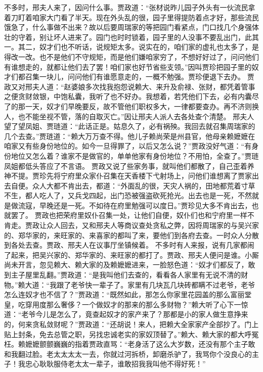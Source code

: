 \documentclass[12pt,oneside]{book}
\begin{document}
不多时，邢夫人来了，因问什么事。贾政道：“张材说昨儿园子外头有一伙流民拿着刀盯着咱家大门看了半天。现在外头乱的很，园子里得提防着点才好，那些流民饿急了，什么事做不出来？故以后要周瑞家的等把园门看紧点，门口找几个身强体壮的守着，别让坏人进来了。园门也时时锁着，园子里的人没事不要乱出门，此其一。其二，奴才们也不听话，说规矩太多。说实在的，咱们家的虚礼也太多了，是得改一改。也不是他们不守规矩，而是他们嫌咱家穷了，不想好好过了，问问他们有谁想走的，就都让他们去了罢！咱们家也好节省些支领。”因叫贾珍把园子里的奴才们都召集一块儿，问问他们有谁愿意走的，一概不勉强。贾珍便退下去办。
贾政又对邢夫人道：“赵婆娘多次找我抱怨说赖大、来升及俞禄、张财，都凭着管事之便贪财敛银，中饱私囊，我听了也不好办。我想着，若凭他们下去，必有内囊尽了的那一天，奴才们早晚要反，故不管他们职权多大，一律都要查办。再不济则换人，也不能坐视不管，落的自取灭亡。”因让邢夫人派人去各处查个清楚。
邢夫人望了望凤姐、贾琏道：“此话正是。姑息久了，必有祸殃。我回去就召集周瑞家的几个去查。”贾琏道：“赖大万万查不得。他儿子赖尚荣是州县官，他母亲赖嬷嬷在咱家又有些身份地位的。如今一旦得罪了，以后又怎么说？”贾政没好气道：“有身份地位又怎么着？谁家不是做官的，单单他家有身份地位？不用怕，全查了。”贾琏凤姐都低头答应了不言语。
贾政又说了些家务事，就叫他们都散了，自己歪着养神不提。贾珍先将宁府里众家仆召集在天香楼下弋射场上，问他们谁想离了贾家出去自便。众人大都不肯出去，都道：“外面乱的很，天灾人祸的，田地都荒着寸草不生，都人吃人了，又兵戈四起，出门恐被强盗砍死抢光。出去也是一死，不然就是做流寇，早晚还是一死。不如待在府里勉强可以度日。”贾珍见大多不肯出去，也就罢了。
贾政也把荣府里奴仆召集一处，让他们自便，奴仆们也和宁府里一样不肯走。贾政让众人回去，又和邢夫人等商议查处贪私之弊，因将周瑞家的与吴兴家的、郑华家的，来旺家的、来喜家的都叫了来，要他们到各府去查。一时众人分散到各处去查。贾政、邢夫人在议事厅坐镇候着。
不多时有人来报，说有几家都闹了起来，把吴兴家的、郑华家的、来旺家的都打了。贾政、邢夫人便问是谁。小厮尚未开言，忽见赖大、赖大家的及赖嬷嬷进来，一脸怒色道：“奴才们都反了，敢到主子屋里乱翻。”贾政道：“是我叫他们去查的，看看各人家里有无说不清的财物。”赖大道：“我跟了老爷快一辈子了。家里有几块瓦几块砖都瞒不过老爷，老爷怎么连奴才也不信了？”贾政道：“既然如此，那怎么你家里花园盖的那么富丽堂皇，吃穿用度那么奢侈？一个做奴才的那来的那么多财物？”赖大听了心下一惊道：“老爷今儿是怎么了，竟查起奴才的家产来了？那都是小的家人做生意挣来的，何来贪私敛财呢？”贾政道：“还胡说！来人，把赖大全家家产全部抄了。门上贴上封条，免去总管之职，另找忠诚老实的家奴顶替了。”赖大、赖大家的都大呼冤枉。赖嬷嬷颤颤巍巍的指着贾政直骂：“老身活了这么大岁数，还没有那个主子敢和我翻过脸。老太太太太一去，你就过河拆桥，卸磨杀驴了，我骂你个没良心的主子！我忠心耿耿服侍老太太一辈子，谁敢招我我叫他不得好死！”
\end{document}
